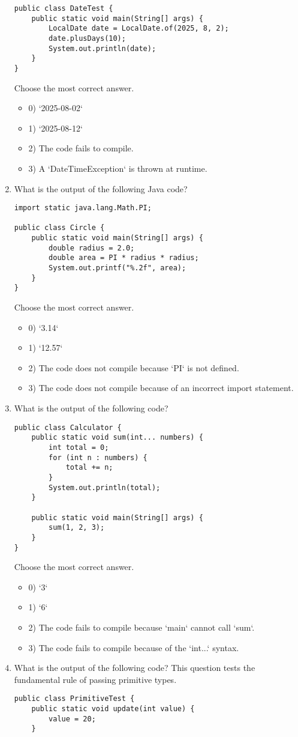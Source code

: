 \documentclass[12pt]{article}
\begin{document}
\begin{enumerate}[label=(\arabic*)]
\begin{verbatim}
public class DateTest {
    public static void main(String[] args) {
        LocalDate date = LocalDate.of(2025, 8, 2);
        date.plusDays(10);
        System.out.println(date);
    }
}
\end{verbatim}
Choose the most correct answer. 
\begin{itemize}
\item 0) `2025-08-02`
\item 1) `2025-08-12`
\item 2) The code fails to compile.
\item 3) A `DateTimeException` is thrown at runtime.
\end{itemize}
\item What is the output of the following Java code?
\begin{verbatim}
import static java.lang.Math.PI;

public class Circle {
    public static void main(String[] args) {
        double radius = 2.0;
        double area = PI * radius * radius;
        System.out.printf("%.2f", area);
    }
}
\end{verbatim}
Choose the most correct answer. 
\begin{itemize}
\item 0) `3.14`
\item 1) `12.57`
\item 2) The code does not compile because `PI` is not defined.
\item 3) The code does not compile because of an incorrect import statement.
\end{itemize}
\item What is the output of the following code?
\begin{verbatim}
public class Calculator {
    public static void sum(int... numbers) {
        int total = 0;
        for (int n : numbers) {
            total += n;
        }
        System.out.println(total);
    }

    public static void main(String[] args) {
        sum(1, 2, 3);
    }
}
\end{verbatim}
Choose the most correct answer. 
\begin{itemize}
\item 0) `3`
\item 1) `6`
\item 2) The code fails to compile because `main` cannot call `sum`.
\item 3) The code fails to compile because of the `int...` syntax.
\end{itemize}
\item What is the output of the following code? This question tests the fundamental rule of passing primitive types.
\begin{verbatim}
public class PrimitiveTest {
    public static void update(int value) {
        value = 20;
    }


\end{verbatim}
\end{enumerate}
\end{document}
